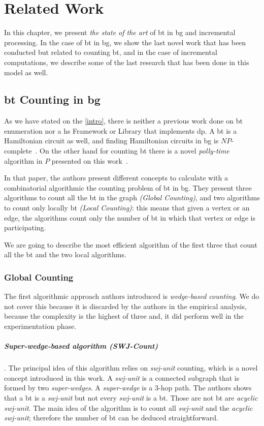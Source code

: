 \chapter{Related Work}\label{relate-work}
In this chapter, we present \emph{the state of the art} of \acrlong{bt} in \acrlong{bg} and incremental processing.
In the case of \acrshort{bt} in \acrshort{bg}, we show the last novel work that has been conducted but related to counting \acrshort{bt},
and in the case of incremental computations, we describe some of the last research that has been done in this model as well. 

\section{\acrlong{bt} Counting in \acrlong{bg}}\label{sec:rel-work:counting}
As we have stated on the \autoref{intro}, there is neither a previous work done on \acrshort{bt} enumeration nor a \acrshort{hs} Framework or Library that implements \acrshort{dp}.
A \acrshort{bt} is a Hamiltonian circuit as well, and finding Hamiltonian circuits in \acrshort{bg} is $NP$-complete~\cite{hamilbipartite-np}. On the other hand for counting \acrshort{bt} there is a novel \emph{polly-time} algorithm 
 in $P$ presented on this work~\cite{btcount}.

In that paper, the authors present different concepts to calculate with a combinatorial algorithmic the counting problem of \acrshort{bt} in \acrshort{bg}. They present three algorithms to count
all the \acrshort{bt} in the graph \emph{(Global Counting)}, and two algorithms to count only locally \acrshort{bt} \emph{(Local Counting)}: this means that given a vertex or an edge, the algorithms count only the number of \acrshort{bt} in which 
that vertex or edge is participating.

We are going to describe the most efficient algorithm of the first three that count all the \acrshort{bt} and the two local algorithms.

\subsection{Global Counting}
The first algorithmic approach authors introduced is \emph{wedge-based counting}. We do not cover this because it is discarded
by the authors in the empirical analysis, because the complexity is the highest of three and, it did perform well in the experimentation phase.

\paragraph{Super-wedge-based algorithm (SWJ-Count)}.
The principal idea of this algorithm relies on \emph{swj-unit} counting, which is a novel 
concept introduced in this work. A \emph{swj-unit} is a connected subgraph that is formed by two \emph{super-wedges}. A \emph{super-wedge}
is a 3-hop path. The authors shows that a \acrshort{bt} is a \emph{swj-unit} but not every \emph{swj-unit} is a \acrshort{bt}. Those 
are not \acrshort{bt} are \emph{acyclic swj-unit}. The main idea of the algorithm is to count all \emph{swj-unit} and the \emph{acyclic swj-unit}; therefore
the number of \acrshort{bt} can be deduced straightforward.

